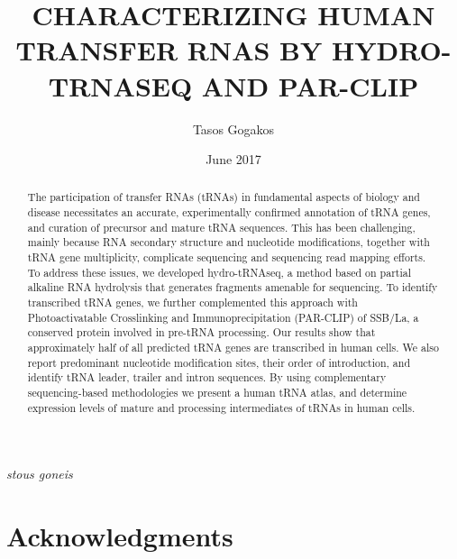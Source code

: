 \documentclass[12pt]{rockefeller}
\newcommand{\textgreek}[1]{\begingroup\fontencoding{LGR}\selectfont#1\endgroup}
\begin{document}
\author{Tasos Gogakos}
\title{\MakeUppercase{Characterizing human transfer rnas by hydro-trnaseq and par-clip}}
\date{June 2017}

\maketitle

\begin{abstract}

The participation of transfer RNAs (tRNAs) in fundamental aspects of biology and disease necessitates an accurate, experimentally confirmed annotation of tRNA genes, and curation of precursor and mature tRNA sequences. This has been challenging, mainly because RNA secondary structure and nucleotide modifications, together with tRNA gene multiplicity, complicate sequencing and sequencing read mapping efforts. To address these issues, we developed hydro-tRNAseq, a method based on partial alkaline RNA hydrolysis that generates fragments amenable for sequencing. To identify transcribed tRNA genes, we further complemented this approach with Photoactivatable Crosslinking and Immunoprecipitation (PAR-CLIP) of SSB/La, a conserved protein involved in pre-tRNA processing. Our results show that approximately half of all predicted tRNA genes are transcribed in human cells. We also report predominant nucleotide modification sites, their order of introduction, and identify tRNA leader, trailer and intron sequences. By using complementary sequencing-based methodologies we present a human tRNA atlas, and determine expression levels of mature and processing intermediates of tRNAs in human cells.
\end{abstract}

\thispagestyle{empty}
\makecopyright

\chapter*{} %
\addtocounter{page}{1} %
\vspace{1.5in} %
\begin{flushright} %
\emph{\textgreek{stous goneis}} %
\end{flushright}

\chapter*{Acknowledgments}
\end{document}
